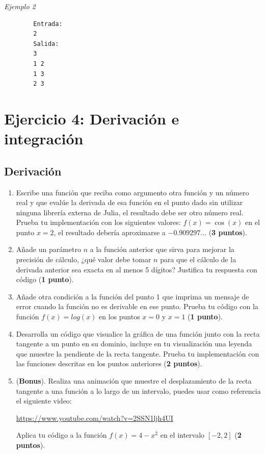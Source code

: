 \documentclass[a4paper,12pt]{article}
\begin{document}
\textit{Ejemplo 2}
    \begin{verbatim}
        Entrada:
        2
        Salida:
        3
        1 2
        1 3
        2 3
    \end{verbatim}
\newpage
\section*{Ejercicio 4: Derivación e integración}
\subsection*{Derivación}
\begin{enumerate}
    \item Escribe una función que reciba como argumento otra función y un número real y que evalúe la derivada de esa función en el punto dado sin utilizar ninguna librería externa de Julia, el resultado debe ser otro número real. Prueba tu implementación con los siguientes valores: $f(x) = \cos(x)$ en el punto $x = 2$, el resultado debería aproximarse a $-0.909297...$ (\textbf{3 puntos}).
    \item Añade un parámetro $n$ a la función anterior que sirva para mejorar la precisión de cálculo, ¿qué valor debe tomar $n$ para que el cálculo de la derivada anterior sea exacta en al menos 5 dígitos? Justifica tu respuesta con código (\textbf{1 punto}).
    \item Añade otra condición a la función del punto 1 que imprima un mensaje de error cuando la función no es derivable en ese punto. Prueba tu código con la función $f(x) = log(x)$ en los puntos $x=0$ y $x=1$ (\textbf{1 punto}).
    \item Desarrolla un código que visualice la gráfica de una función junto con la recta tangente a un punto en su dominio, incluye en tu visualización una leyenda que muestre la pendiente de la recta tangente. Prueba tu implementación con las funciones descritas en los puntos anteriores (\textbf{2 puntos}).
    \item (\textbf{Bonus}). Realiza una animación que muestre el desplazamiento de la recta tangente a una función a lo largo de un intervalo, puedes usar como referencia el siguiente video:
    
    \url{https://www.youtube.com/watch?v=2SSN1ljh4UI}

    Aplica tu código a la función $f(x) = 4-x^2$ en el intervalo $[-2,2]$ (\textbf{2 puntos}).
    
\end{enumerate}
\end{document}
